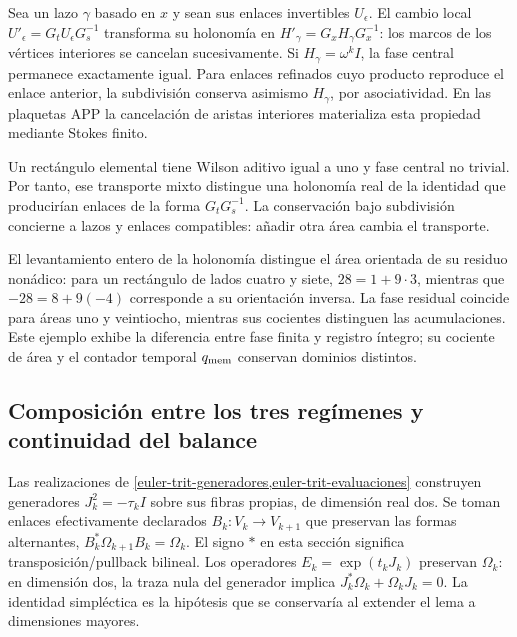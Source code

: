 \begin{proposition}

Sea un lazo \(\gamma\) basado en \(x\) y sean sus enlaces invertibles \(U_\epsilon\). El cambio local \(U'_\epsilon=G_tU_\epsilon G_s^{-1}\) transforma su holonomía en \(H'_\gamma=G_xH_\gamma G_x^{-1}\): los marcos de los vértices interiores se cancelan sucesivamente. Si \(H_\gamma=\omega^kI\), la fase central permanece exactamente igual. Para enlaces refinados cuyo producto reproduce el enlace anterior, la subdivisión conserva asimismo \(H_\gamma\), por asociatividad. En las plaquetas APP la cancelación de aristas interiores materializa esta propiedad mediante Stokes finito.
\end{proposition}

Un rectángulo elemental tiene Wilson aditivo igual a uno y fase central no trivial. Por tanto, ese transporte mixto distingue una holonomía real de la identidad que producirían enlaces de la forma \(G_tG_s^{-1}\). La conservación bajo subdivisión concierne a lazos y enlaces compatibles: añadir otra área cambia el transporte.

El levantamiento entero de la holonomía distingue el área orientada de su residuo nonádico: para un rectángulo de lados cuatro y siete, \(28=1+9\cdot3\), mientras que \(-28=8+9(-4)\) corresponde a su orientación inversa. La fase residual coincide para áreas uno y veintiocho, mientras sus cocientes distinguen las acumulaciones. Este ejemplo exhibe la diferencia entre fase finita y registro íntegro; su cociente de área y el contador temporal \(q_{\rm mem}\) conservan dominios distintos.

\subsection{Composición entre los tres regímenes y continuidad del balance}

Las realizaciones de \cref{euler-trit-generadores,euler-trit-evaluaciones} construyen generadores \(J_k^2=-\tau_kI\) sobre sus fibras propias, de dimensión real dos. Se toman enlaces efectivamente declarados \(B_k:V_k\to V_{k+1}\) que preservan las formas alternantes, \(B_k^*\Omega_{k+1}B_k=\Omega_k\). El signo \(*\) en esta sección significa transposición/pullback bilineal. Los operadores \(E_k=\exp(t_kJ_k)\) preservan \(\Omega_k\): en dimensión dos, la traza nula del generador implica \(J_k^*\Omega_k+\Omega_kJ_k=0\). La identidad simpléctica es la hipótesis que se conservaría al extender el lema a dimensiones mayores.

